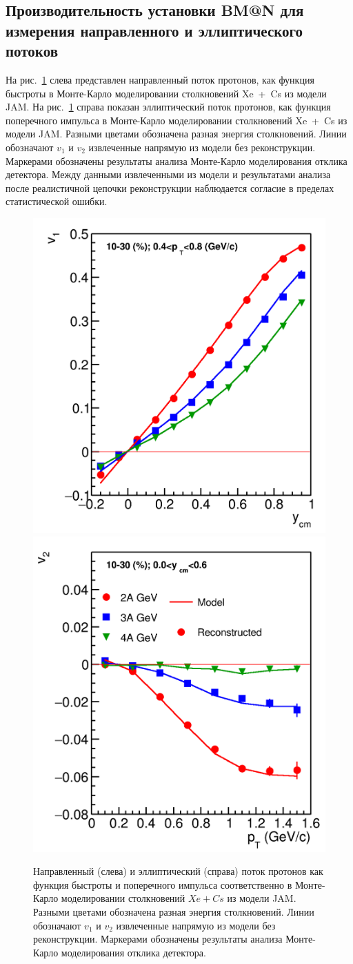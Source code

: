 \subsection{Производительность установки BM@N для измерения направленного и эллиптического потоков}

На рис.~\ref{fig:bmn_v1_v2} слева представлен направленный поток протонов, как функция быстроты в Монте-Карло моделировании столкновений Xe~+~Cs из модели JAM. 
На рис.~\ref{fig:bmn_v1_v2} справа показан эллиптический поток протонов, как функция поперечного импульса в Монте-Карло моделировании столкновений Xe~+~Cs из модели JAM. 
Разными цветами обозначена разная энергия столкновений. 
Линии обозначают $v_1$ и $v_2$ извлеченные напрямую из модели без реконструкции. 
Маркерами обозначены результаты анализа Монте-Карло моделирования отклика детектора.
Между данными извлеченными из модели и результатами анализа после реалистичной цепочки реконструкции наблюдается согласие в пределах статистической ошибки. 
%
\begin{figure}[ht]
\begin{center}
\includegraphics[width=0.45\linewidth]{images/v1_proton_tof_rapidity.png}
\includegraphics[width=0.45\linewidth]{images/v2_proton_tof_pT.png}
\caption{ 
    Направленный (слева) и эллиптический (справа) поток протонов как функция быстроты и поперечного импульса соответственно в Монте-Карло моделировании столкновений $Xe+Cs$ из модели JAM. Разными цветами обозначена разная энергия столкновений. Линии обозначают $v_1$ и $v_2$ извлеченные напрямую из модели без реконструкции. Маркерами обозначены результаты анализа Монте-Карло моделирования отклика детектора.
}
\label{fig:bmn_v1_v2}
\end{center}
\end{figure}

